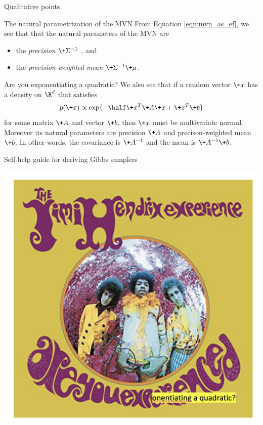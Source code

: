\documentclass[10pt]{beamer}
\begin{document}
\begin{frame}{Qualitative points}
	
\begin{block}{The natural parametrization of the MVN}
From Equation \eqref{eqn:mvn_as_ef}, we see that that the natural parameters of the MVN are 
\begin{itemize}
\item  the \textit{precision} $\+\Sigma^{-1}$ , and 
\item the \textit{precision-weighted mean} $\+\Sigma^{-1} \+\mu$. 
\end{itemize}
\end{block}

\vfill 

\begin{block}{Are you exponentiating a quadratic?}
We also see that if a random vector $\+x$ has a density on $\R^d$ that satisfies
 \[ p(\+x) \propto \exp \{ -\half \+x^T \+A \+x + \+x^T \+b\} \] 
 for some matrix $\+A$ and vector $\+b$, then $\+x$ must be multivariate normal. Moreover its natural parameters are precision $\+A$ and precison-weighted mean $\+b$.  In other words, the covariance is $\+A^{-1}$ and the mean is $\+A^{-1}\+b$. 
\end{block}
\end{frame}

\begin{frame}{Self-help guide for deriving Gibbs samplers}
\begin{center}
\includegraphics[width=.8\textwidth]{images/are_you_exponentiating_a_quadratic}	
\end{center}

\end{frame}
\end{document}
